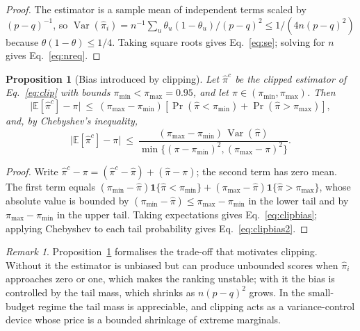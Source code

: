 \documentclass[pdflatex,sn-basic,Numbered]{sn-jnl}
\theoremstyle{plain}
\newtheorem{proposition}[theorem]{Proposition}
\theoremstyle{remark}
\newtheorem{remark}{Remark}
\theoremstyle{definition}
\newcommand{\Prob}{\Pr}
\newcommand{\E}{\mathbb{E}}
\newcommand{\Var}{\operatorname{Var}}
\begin{document}
\begin{proof}
The estimator is a sample mean of independent terms scaled by $(p-q)^{-1}$, so $\Var(\hat\pi_i)=n^{-1}\sum_u\theta_u(1-\theta_u)/(p-q)^{2}\le 1/(4n(p-q)^{2})$ because $\theta(1-\theta)\le1/4$. Taking square roots gives Eq.~\eqref{eq:se}; solving for $n$ gives Eq.~\eqref{eq:nreq}.
\end{proof}

\begin{proposition}[Bias introduced by clipping]\label{prop:clipping}
Let $\hat\pi^{c}$ be the clipped estimator of Eq.~\eqref{eq:clip} with bounds $\pi_{\min}<\pi_{\max}=0.95$, and let $\pi\in(\pi_{\min},\pi_{\max})$. Then
\begin{equation}\label{eq:clipbias}
\big|\E[\hat\pi^{c}]-\pi\big|
\ \le\ (\pi_{\max}-\pi_{\min})\left[\Prob(\hat\pi<\pi_{\min})+\Prob(\hat\pi>\pi_{\max})\right],
\end{equation}
and, by Chebyshev's inequality,
\begin{equation}\label{eq:clipbias2}
\big|\E[\hat\pi^{c}]-\pi\big|
\ \le\ \frac{(\pi_{\max}-\pi_{\min})\,\Var(\hat\pi)}
{\min\{(\pi-\pi_{\min})^{2},(\pi_{\max}-\pi)^{2}\}} .
\end{equation}
\end{proposition}

\begin{proof}
Write $\hat\pi^{c}-\pi=(\hat\pi^{c}-\hat\pi)+(\hat\pi-\pi)$; the second term has zero mean. The first term equals $(\pi_{\min}-\hat\pi)\mathbf 1\{\hat\pi<\pi_{\min}\}+(\pi_{\max}-\hat\pi)\mathbf 1\{\hat\pi>\pi_{\max}\}$, whose absolute value is bounded by $(\pi_{\min}-\hat\pi)\le\pi_{\max}-\pi_{\min}$ in the lower tail and by $\pi_{\max}-\pi_{\min}$ in the upper tail. Taking expectations gives Eq.~\eqref{eq:clipbias}; applying Chebyshev to each tail probability gives Eq.~\eqref{eq:clipbias2}.
\end{proof}

\begin{remark}
Proposition~\ref{prop:clipping} formalises the trade-off that motivates clipping. Without it the estimator is unbiased but can produce unbounded scores when $\hat\pi_i$ approaches zero or one, which makes the ranking unstable; with it the bias is controlled by the tail mass, which shrinks as $n(p-q)^{2}$ grows. In the small-budget regime the tail mass is appreciable, and clipping acts as a variance-control device whose price is a bounded shrinkage of extreme marginals.
\end{remark}
\end{document}
